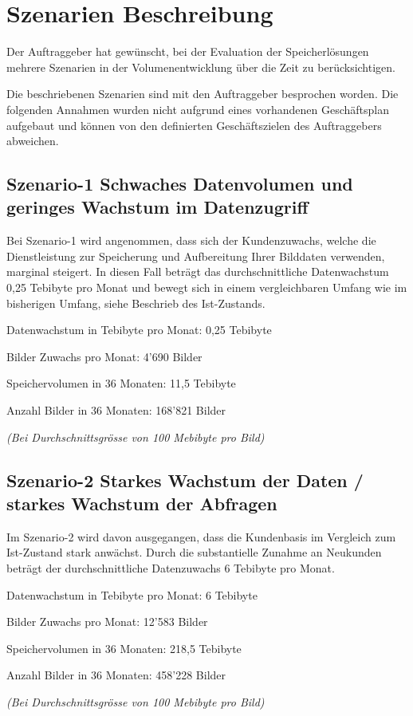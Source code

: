 
\cleardoublepage
\chapter{Szenarien Beschreibung}
Der Auftraggeber hat gewünscht, bei der Evaluation der Speicherlösungen mehrere Szenarien in der Volumenentwicklung über die Zeit zu berücksichtigen. 

Die beschriebenen Szenarien sind mit den Auftraggeber besprochen worden. Die folgenden Annahmen wurden nicht aufgrund eines vorhandenen Geschäftsplan aufgebaut und können von den definierten Geschäftszielen des Auftraggebers abweichen. 


\section{Szenario-1 Schwaches Datenvolumen und geringes Wachstum im Datenzugriff}%
Bei Szenario-1 wird angenommen, dass sich der Kundenzuwachs, welche die Dienstleistung zur Speicherung und Aufbereitung Ihrer Bilddaten verwenden, marginal steigert. In diesen Fall beträgt das durchschnittliche Datenwachstum 0,25 Tebibyte pro Monat und bewegt sich in einem vergleichbaren Umfang wie im bisherigen Umfang, siehe Beschrieb des Ist-Zustands.


Datenwachstum in Tebibyte pro Monat: 0,25 Tebibyte

Bilder Zuwachs pro Monat: 4'690 Bilder 

Speichervolumen in 36 Monaten: 11,5 Tebibyte

Anzahl Bilder in 36 Monaten: 168'821 Bilder

\textit{(Bei Durchschnittsgrösse von 100 Mebibyte pro Bild)}

\section{Szenario-2 Starkes Wachstum der Daten / starkes Wachstum der Abfragen}
Im Szenario-2 wird davon ausgegangen, dass die Kundenbasis im Vergleich zum Ist-Zustand stark anwächst. Durch die substantielle Zunahme an Neukunden beträgt der durchschnittliche Datenzuwachs 6 Tebibyte pro Monat.


Datenwachstum in Tebibyte pro Monat: 6 Tebibyte

Bilder Zuwachs pro Monat: 12'583 Bilder

Speichervolumen in 36 Monaten: 218,5 Tebibyte

Anzahl Bilder in 36 Monaten: 458'228 Bilder

\textit{(Bei Durchschnittsgrösse von 100 Mebibyte pro Bild)}
 
